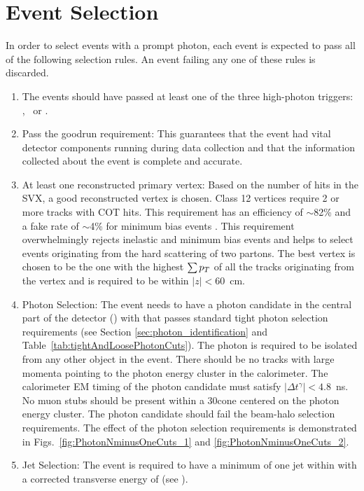 \section{Event Selection}\label{sec:EventSelection}
In order to select events with a prompt photon, each event is expected to pass all of the following selection rules. An event failing any one of these rules is discarded.
\vspace{-0.02\textheight}
\begin{singlespace}
\begin{enumerate}
\item{The events should have passed at least one of the three high-\pt photon triggers: \firstphotrig, \secondphotrig\ or \thirdphotrig.
}
\item{Pass the goodrun requirement: This guarantees that the event had vital detector components running during data collection and that the information collected about the event is complete and accurate.}
\item{At least one reconstructed primary vertex: Based on the number of hits in the SVX, a good reconstructed  vertex is chosen. Class 12 vertices require 2 or more tracks with COT hits. This requirement has an efficiency of $\sim$82\% and a fake rate of $\sim$4\% for minimum bias events \cite{cdfnote:6239}. This requirement overwhelmingly rejects inelastic and minimum bias events and helps to select events originating from the hard scattering of two partons. The best vertex is chosen to be the one with the highest $\sum \mbox{$p_T$}$ of all the tracks originating from the vertex and is required to be within $|z|<60$~cm.}
\item{Photon Selection: The event needs to have a photon candidate in the central part of the detector () with  that passes standard tight photon selection requirements (see Section \ref{sec:photon_identification} and Table~\ref{tab:tightAndLoosePhotonCuts}). The photon is required to be isolated from any other object in the event. There should be no tracks with large momenta pointing to the photon energy cluster in the calorimeter. The calorimeter EM timing of the photon candidate must satisfy $|\Delta t^{\gamma}| < 4.8$~ns. No muon stubs should be present within a 30\degree cone centered on the photon energy cluster. The photon candidate should fail the beam-halo selection requirements. The effect of the photon selection requirements is demonstrated in Figs.~\ref{fig:PhotonNminusOneCuts_1} and \ref{fig:PhotonNminusOneCuts_2}.}
\item{Jet Selection: The event is required to have a minimum of one jet within  with a corrected transverse energy of  (see ).}

\end{enumerate}
\end{singlespace}
